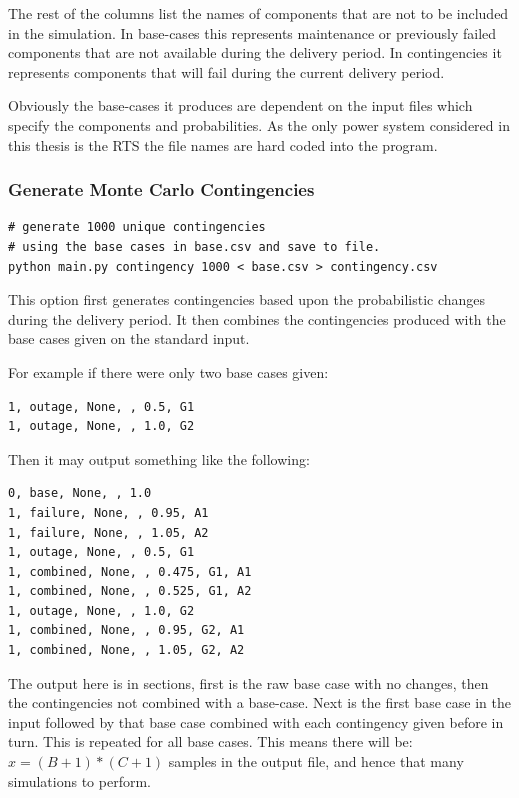 \documentclass[a4paper,oneside,12pt]{report}
\begin{document}
The rest of the columns list the names of components that are not to be included in the simulation. In base-cases this represents maintenance or previously failed components that are not available during the delivery period. In contingencies it represents components that will fail during the current delivery period.

Obviously the base-cases it produces are dependent on the input files which specify the components and probabilities. As the only power system considered in this thesis is the RTS the file names are hard coded into the program.


\subsubsection{Generate Monte Carlo Contingencies}

\begin{verbatim}
# generate 1000 unique contingencies
# using the base cases in base.csv and save to file.
python main.py contingency 1000 < base.csv > contingency.csv
\end{verbatim}

This option first generates contingencies based upon the probabilistic changes during the delivery period. It then combines the contingencies produced with the base cases given on the standard input.

For example if there were only two base cases given:

\begin{verbatim}
1, outage, None, , 0.5, G1
1, outage, None, , 1.0, G2
\end{verbatim}

Then it may output something like the following:

\begin{verbatim}
0, base, None, , 1.0
1, failure, None, , 0.95, A1
1, failure, None, , 1.05, A2
1, outage, None, , 0.5, G1
1, combined, None, , 0.475, G1, A1
1, combined, None, , 0.525, G1, A2
1, outage, None, , 1.0, G2
1, combined, None, , 0.95, G2, A1
1, combined, None, , 1.05, G2, A2
\end{verbatim}

The output here is in sections, first is the raw base case with no changes, then the contingencies not combined with a base-case. Next is the first base case in the input followed by that base case combined with each contingency given before in turn. This is repeated for all base cases. This means there will be: $ x = (B+1)*(C+1) $ samples in the output file, and hence that many simulations to perform.
\end{document}
